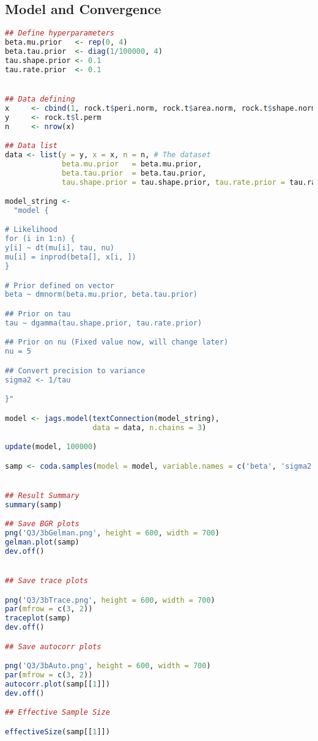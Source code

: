 \documentclass{article}
\begin{document}
\subsection{Model and Convergence} \label{appA3b}
\begin{lstlisting}[language=R]
## Define hyperparameters
beta.mu.prior   <- rep(0, 4)
beta.tau.prior  <- diag(1/100000, 4)
tau.shape.prior <- 0.1
tau.rate.prior  <- 0.1


## Data defining
x     <- cbind(1, rock.t$peri.norm, rock.t$area.norm, rock.t$shape.norm)
y     <- rock.t$l.perm
n     <- nrow(x)

## Data list
data <- list(y = y, x = x, n = n, # The dataset 
             beta.mu.prior   = beta.mu.prior, 
             beta.tau.prior  = beta.tau.prior, 
             tau.shape.prior = tau.shape.prior, tau.rate.prior = tau.rate.prior) 

model_string <-   
  "model {

# Likelihood
for (i in 1:n) {
y[i] ~ dt(mu[i], tau, nu)
mu[i] = inprod(beta[], x[i, ])
}

# Prior defined on vector
beta ~ dmnorm(beta.mu.prior, beta.tau.prior)

## Prior on tau
tau ~ dgamma(tau.shape.prior, tau.rate.prior)

## Prior on nu (Fixed value now, will change later)
nu = 5

## Convert precision to variance
sigma2 <- 1/tau

}"

model <- jags.model(textConnection(model_string), 
                    data = data, n.chains = 3)

update(model, 100000)

samp <- coda.samples(model = model, variable.names = c('beta', 'sigma2'), n.iter = 250000, thin = 50)


## Result Summary
summary(samp)

## Save BGR plots
png('Q3/3bGelman.png', height = 600, width = 700)
gelman.plot(samp)
dev.off()


## Save trace plots

png('Q3/3bTrace.png', height = 600, width = 700)
par(mfrow = c(3, 2))
traceplot(samp)
dev.off()

## Save autocorr plots

png('Q3/3bAuto.png', height = 600, width = 700)
par(mfrow = c(3, 2))
autocorr.plot(samp[[1]])
dev.off()

## Effective Sample Size

effectiveSize(samp[[1]])


\end{lstlisting}
\end{document}
